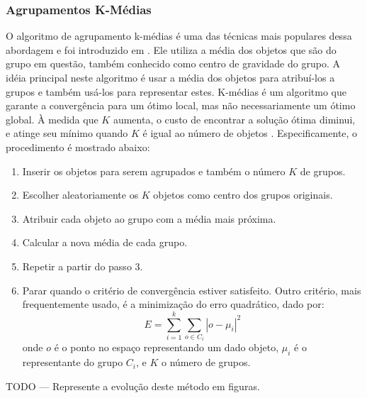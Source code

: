 \subsubsection{Agrupamentos K-Médias}
O algoritmo de agrupamento k-médias é uma das técnicas mais populares dessa abordagem e foi introduzido em \cite{Macqueen67}. Ele utiliza a média dos objetos que são do grupo em questão, também conhecido como centro de gravidade do grupo.  A idéia principal neste algoritmo é usar a média dos objetos para atribuí-los a grupos e também usá-los para  representar estes.
K-médias é um algoritmo que garante a convergência para um ótimo local, mas não necessariamente um ótimo global. À medida que ${K}$ aumenta, o custo de encontrar a solução ótima diminui, e atinge seu mínimo quando ${K}$ é igual ao número de objetos \cite{Wu2008}. Especificamente, o procedimento é mostrado abaixo:
 \begin{enumerate}
	\item Inserir os objetos para serem agrupados e também o número ${K}$ de grupos.
	\item Escolher aleatoriamente os ${K}$ objetos como centro dos grupos originais.
	\item Atribuir cada objeto ao grupo com a média mais próxima.
	\item Calcular a nova média de cada grupo.
	\item Repetir a partir do passo 3.
	\item Parar quando o critério de convergência estiver satisfeito. Outro critério, mais frequentemente usado, é a minimização do erro quadrático, dado por: 
	\begin{equation}
	E = \sum_{i=1}^{k}\sum_{o\in C_{i}} |o - \mu_{i}|^{2}
	\end{equation}
	onde ${o}$ é o ponto no espaço representando um dado objeto, ${\mu_{i}}$ é o representante do grupo ${C_{i}}$,
	 e ${K}$ o número de grupos.
\end{enumerate}

TODO --- Represente a evolução deste método em figuras.
